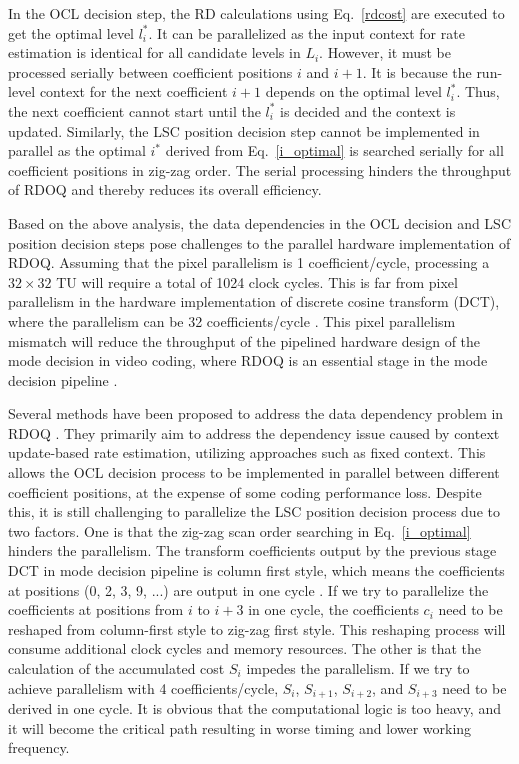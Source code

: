 \documentclass[lettersize,journal]{IEEEtran}
\begin{document}
In the OCL decision step, the RD calculations using Eq.~\eqref{rdcost} are executed to get the optimal level $l_{i}^{*}$. It can be parallelized as the input context for rate estimation is identical for all candidate levels in $L_{i}$. However, it must be processed serially between coefficient positions $i$ and $i+1$. It is because the run-level context for the next coefficient $i+1$ depends on the optimal level $l_{i}^{*}$. Thus, the next coefficient cannot start until the $l_{i}^{*}$ is decided and the context is updated. Similarly, the LSC position decision step cannot be implemented in parallel as the optimal $i_{}^{*}$ derived from Eq.~\eqref{i_optimal} is searched serially for all coefficient positions in zig-zag order. The serial processing hinders the throughput of RDOQ and thereby reduces its overall efficiency. 

Based on the above analysis, the data dependencies in the OCL decision and LSC position decision steps pose challenges to the parallel hardware implementation of RDOQ. Assuming that the pixel parallelism is 1 coefficient/cycle, processing a $32\times32$ TU will require a total of 1024 clock cycles. This is far from pixel parallelism in the hardware implementation of discrete cosine transform (DCT), where the parallelism can be 32 coefficients/cycle \cite{meher2013efficient,fan2019pipelined,Hao2023Multiple}. This pixel parallelism mismatch will reduce the throughput of the pipelined hardware design of the mode decision in video coding, where RDOQ is an essential stage in the mode decision pipeline \cite{sun2017fast,zhang2018efficient,huang2018three,zhang2018highly}.

Several methods have been proposed to address the data dependency problem in RDOQ \cite{igarashi2018parallelGPU,xu2022hardwarefriendlyforrdoq,zhao2023scanline}. They primarily aim to address the dependency issue caused by context update-based rate estimation, utilizing approaches such as fixed context. This allows the OCL decision process to be implemented in parallel between different coefficient positions, at the expense of some coding performance loss. Despite this, it is still challenging to parallelize the LSC position decision process due to two factors. One is that the zig-zag scan order searching in Eq.~\eqref{i_optimal} hinders the parallelism. The transform coefficients output by the previous stage DCT in mode decision pipeline is column first style, which means the coefficients at positions (0, 2, 3, 9, ...) are output in one cycle \cite{fan2019pipelined}. If we try to parallelize the coefficients at positions from $i$ to $i+3$ in one cycle, the coefficients $c_i$ need to be reshaped from column-first style to zig-zag first style. This reshaping process will consume additional clock cycles and memory resources. The other is that the calculation of the accumulated cost $S_{i}$ impedes the parallelism. If we try to achieve parallelism with 4 coefficients/cycle, $S_{i}$, $S_{i+1}$, $S_{i+2}$, and $S_{i+3}$ need to be derived in one cycle. It is obvious that the computational logic is too heavy, and it will become the critical path resulting in worse timing and lower working frequency. 
\end{document}
